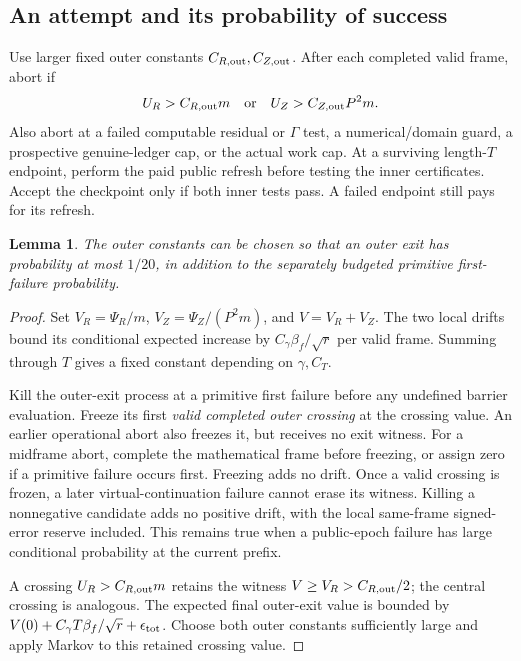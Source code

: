\documentclass[11pt]{article}
\newtheorem{lemma}[theorem]{Lemma}
\theoremstyle{remark}
\begin{document}
\subsection{An attempt and its probability of success}

Use larger fixed outer constants $C_{R,\rm out},C_{Z,\rm out}$.
After each completed valid frame, abort if
\[
 U_R>C_{R,\rm out}m
 \quad\hbox{or}\quad
 U_Z>C_{Z,\rm out}P^2m.
\]
Also abort at a failed computable residual or $\Gamma$ test, a numerical/domain
guard, a prospective genuine-ledger cap, or the actual work cap.
At a surviving length-$T$ endpoint, perform the paid public refresh before
testing the inner certificates.
Accept the checkpoint only if both inner tests pass.
A failed endpoint still pays for its refresh.

\begin{lemma}
\label{lem:ram-outer-exit}
The outer constants can be chosen so that an outer exit has probability at most
$1/20$, in addition to the separately budgeted primitive first-failure
probability.
\end{lemma} \begin{proof} Set $V_R=\Psi_R/m$, $V_Z=\Psi_Z/(P^2m)$, and
$V=V_R+V_Z$.
The two local drifts bound its conditional expected increase by
$C_\gamma\beta_f/\sqrt r$ per valid frame.
Summing through $T$ gives a fixed constant depending on $\gamma,C_T$.

Kill the outer-exit process at a primitive first failure before any undefined
barrier evaluation.
Freeze its first \emph{valid completed outer crossing} at the crossing value.
An earlier operational abort also freezes it, but receives no exit witness.
For a midframe abort, complete the mathematical frame before freezing, or assign
zero if a primitive failure occurs first.
Freezing adds no drift.
Once a valid crossing is frozen, a later virtual-continuation failure cannot
erase its witness.
Killing a nonnegative candidate adds no positive drift, with the local
same-frame signed-error reserve included.
This remains true when a public-epoch failure has large conditional probability
at the current prefix.

A crossing $U_R>C_{R,\rm out}m$ retains the witness $V\ge V_R>C_{R,\rm out}/2$;
the central crossing is analogous.
The expected final outer-exit value is bounded by $V(0)+C_\gamma T\beta_f/\sqrt
r+\epsilon_{\rm tot}$.
Choose both outer constants sufficiently large and apply Markov to this retained
crossing value.
\end{proof}
\end{document}
